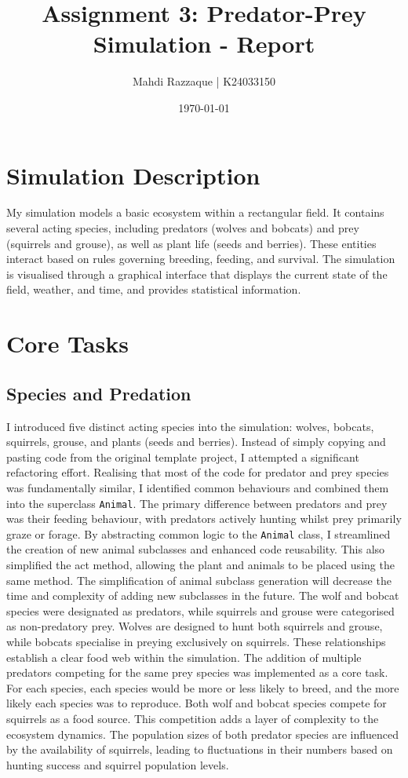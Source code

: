 \documentclass{article}
\title{Assignment 3: Predator-Prey Simulation - Report}
\author{
    Mahdi Razzaque | K24033150
}
\date{\today}
\begin{document}
\maketitle

\section{Simulation Description}

My simulation models a basic ecosystem within a rectangular field. It contains several acting species, including predators (wolves and bobcats) and prey (squirrels and grouse), as well as plant life (seeds and berries). These entities interact based on rules governing breeding, feeding, and survival. The simulation is visualised through a graphical interface that displays the current state of the field, weather, and time, and provides statistical information.

\section{Core Tasks}

\subsection{Species and Predation}

I introduced five distinct acting species into the simulation: wolves, bobcats, squirrels, grouse, and plants (seeds and berries). Instead of simply copying and pasting code from the original template project, I attempted a significant refactoring effort. Realising that most of the code for predator and prey species was fundamentally similar, I identified common behaviours and combined them into the superclass \texttt{Animal}. The primary difference between predators and prey was their feeding behaviour, with predators actively hunting whilst prey primarily graze or forage. By abstracting common logic to the \texttt{Animal} class, I streamlined the creation of new animal subclasses and enhanced code reusability. This also simplified the act method, allowing the plant and animals to be placed using the same method. The simplification of animal subclass generation will decrease the time and complexity of adding new subclasses in the future.
The wolf and bobcat species were designated as predators, while squirrels and grouse were categorised as non-predatory prey. Wolves are designed to hunt both squirrels and grouse, while bobcats specialise in preying exclusively on squirrels. These relationships establish a clear food web within the simulation. The addition of multiple predators competing for the same prey species was implemented as a core task. For each species, each species would be more or less likely to breed, and the more likely each species was to reproduce. Both wolf and bobcat species compete for squirrels as a food source. This competition adds a layer of complexity to the ecosystem dynamics. The population sizes of both predator species are influenced by the availability of squirrels, leading to fluctuations in their numbers based on hunting success and squirrel population levels.
\end{document}
